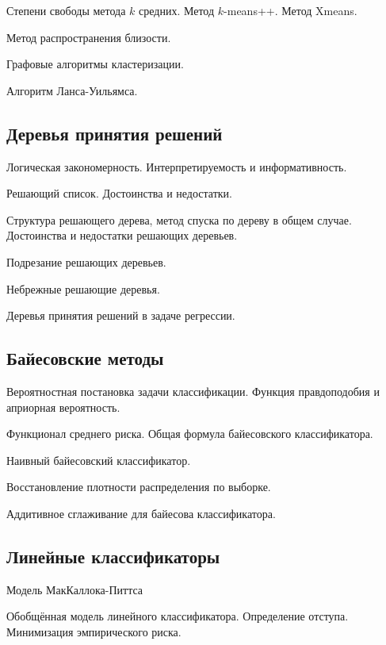 \documentclass[a4paper,12pt]{article}
\begin{document}
  \myparagraph Степени свободы метода $k$ средних. Метод $k$-means++. Метод Xmeans. 

  \myparagraph Метод распространения близости.
  
  \myparagraph Графовые алгоритмы кластеризации.
  
  \myparagraph Алгоритм Ланса-Уильямса.  

  \subsection*{Деревья принятия решений}  

  \myparagraph Логическая закономерность. Интерпретируемость и информативность.

  \myparagraph Решающий список. Достоинства и недостатки.
  
  \myparagraph Структура решающего дерева, метод спуска по дереву в общем случае. Достоинства и недостатки решающих деревьев.

  \myparagraph Подрезание решающих деревьев.
  
  \myparagraph Небрежные решающие деревья.
  
  \myparagraph Деревья принятия решений в задаче регрессии.
    
  \subsection*{Байесовские методы}
  
  \myparagraph Вероятностная постановка задачи классификации. Функция правдоподобия и априорная вероятность.
  
  \myparagraph Функционал среднего риска. Общая формула байесовского классификатора.
  
  \myparagraph Наивный байесовский классификатор.

  \myparagraph Восстановление плотности распределения по выборке.
  
  \myparagraph Аддитивное сглаживание для байесова классификатора.
  
  \subsection*{Линейные классификаторы}
  
  \myparagraph Модель МакКаллока-Питтса   
  
  \myparagraph Обобщённая модель линейного классификатора. Определение отступа. Минимизация эмпирического риска.
\end{document}
